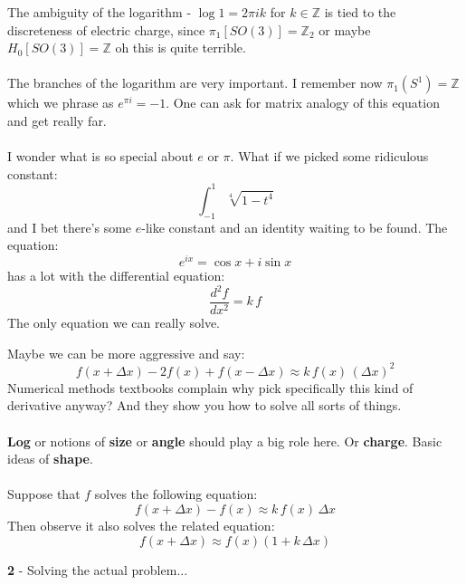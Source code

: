 \documentclass[12pt]{article}
\begin{document}
\noindent The ambiguity of the logarithm - $\log 1 = 2\pi i k$ for $k \in \mathbb{Z}$ is tied to the discreteness of electric charge, since $\pi_1[SO(3)] = \mathbb{Z}_2$ or maybe $ H_0[SO(3)] = \mathbb{Z} $ oh this is quite terrible. \\ \\
The branches of the logarithm are very important.  I remember now $\pi_1(S^1) = \mathbb{Z}$ which we phrase as $e^{\pi i } = -1 $.  One can ask for matrix analogy of this equation and get really far. \\ \\
I wonder what is so special about $e$ or $\pi$.  What if we picked some ridiculous constant:
$$ \int_{-1}^1 \sqrt[4]{1 - t^4} $$
and I bet there's some $e$-like constant and an identity waiting to be found.  The equation:
$$ e^{ix} = \cos x + i \sin x $$
has a lot with the differential equation:
$$ \frac{d^2 f}{dx^2} = k\, f$$
The only equation we can really solve.  \newpage 

\noindent Maybe we can be more aggressive and say:
$$ f(x + \Delta x) - 2 f(x) + f(x - \Delta x) \approx k \, f(x) \, (\Delta x)^2 $$
Numerical methods textbooks complain why pick specifically this kind of derivative anyway?  And they show you how to solve all sorts of things. \\ \\
\textbf{Log} or notions of \textbf{size} or \textbf{angle} should play a big role here.  Or \textbf{charge}.  Basic ideas of \textbf{shape}.  \\ \\
Suppose that $f$ solves the following equation:
$$ f(x + \Delta x) - f(x) \approx k \, f(x) \, \Delta x $$
Then observe it also solves the related equation:
$$ f(x + \Delta x) \approx f(x) (1 + k  \, \Delta x) $$
 \newpage

\noindent \textbf{2} - Solving the actual problem... \\ \\
\newpage

\selectfont \fontsize{12}{10}\selectfont
\end{document}
